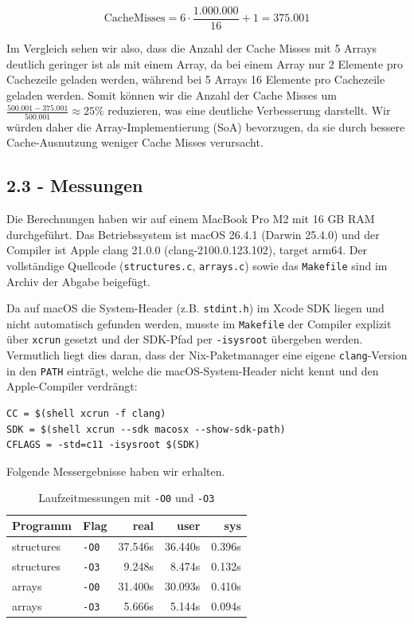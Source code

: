 $$
\text{CacheMisses} = 6 \cdot \frac{1.000.000}{16} + 1 = 375.001
$$

Im Vergleich sehen wir also, dass die Anzahl der Cache Misses mit 5 Arrays deutlich geringer ist als mit einem Array, da bei einem Array nur 2 Elemente pro Cachezeile geladen werden, während bei 5 Arrays 16 Elemente pro Cachezeile geladen werden. Somit können wir die Anzahl der Cache Misses um $\frac{500.001 - 375.001}{500.001} \approx 25\%$ reduzieren, was eine deutliche Verbesserung darstellt. 
Wir würden daher die Array-Implementierung (SoA) bevorzugen, da sie durch bessere Cache-Ausnutzung weniger Cache Misses verursacht. 

\subsection*{2.3 - Messungen}

Die Berechnungen haben wir auf einem MacBook Pro M2 mit 16 GB RAM durchgeführt. Das Betriebssystem ist macOS 26.4.1 (Darwin 25.4.0) und der Compiler ist Apple clang 21.0.0 (clang-2100.0.123.102), target arm64. Der vollständige Quellcode (\texttt{structures.c}, \texttt{arrays.c}) sowie das \texttt{Makefile} sind im Archiv der Abgabe beigefügt.

Da auf macOS die System-Header (z.B. \texttt{stdint.h}) im Xcode SDK liegen und nicht automatisch gefunden werden,
musste im \texttt{Makefile} der Compiler explizit über \texttt{xcrun} gesetzt und der SDK-Pfad per \texttt{-isysroot}
übergeben werden. Vermutlich liegt dies daran, dass der Nix-Paketmanager eine eigene \texttt{clang}-Version
in den \texttt{PATH} einträgt, welche die macOS-System-Header nicht kennt und den Apple-Compiler verdrängt:

\begin{verbatim}
CC = $(shell xcrun -f clang)
SDK = $(shell xcrun --sdk macosx --show-sdk-path)
CFLAGS = -std=c11 -isysroot $(SDK)
\end{verbatim}

Folgende Messergebnisse haben wir erhalten.

\begin{table}[H]
  \centering
  \begin{tabular}{|l|l|r|r|r|}
    \hline
    \textbf{Programm} & \textbf{Flag} & \textbf{real} & \textbf{user} & \textbf{sys} \\
    \hline
    structures & \texttt{-O0} & 37.546s & 36.440s & 0.396s \\
    structures & \texttt{-O3} & 9.248s & 8.474s & 0.132s \\
    arrays     & \texttt{-O0} & 31.400s & 30.093s & 0.410s \\
    arrays     & \texttt{-O3} & 5.666s & 5.144s & 0.094s \\
    \hline
  \end{tabular}
  \caption{Laufzeitmessungen mit \texttt{-O0} und \texttt{-O3}}
  \label{tab:timing}
\end{table}

